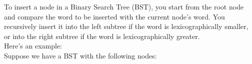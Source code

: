 \documentclass[preview]{standalone}
\begin{document}
To insert a node in a Binary Search Tree (BST), you start from the root node and compare the word to be inserted with the current node's word. You recursively insert it into the left subtree if the word is lexicographically smaller, or into the right subtree if the word is lexicographically greater.\\Here's an example:\\Suppose we have a BST with the following nodes:\\
\end{document}
